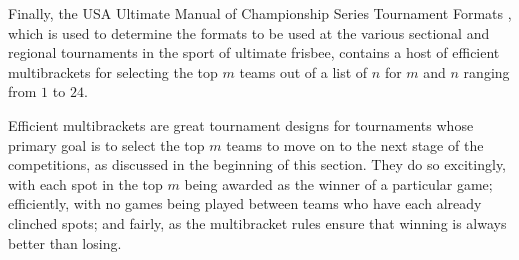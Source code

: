 {    Finally, the USA Ultimate Manual of Championship Series Tournament Formats \cite{ultimate}, which is used to determine the formats to be used at the various sectional and regional tournaments in the sport of ultimate frisbee, contains a host of efficient multibrackets for selecting the top $m$ teams out of a list of $n$ for $m$ and $n$ ranging from $1$ to $24.$

    Efficient multibrackets are great tournament designs for tournaments whose primary goal is to select the top $m$ teams to move on to the next stage of the competitions, as discussed in the beginning of this section. They do so excitingly, with each spot in the top $m$ being awarded as the winner of a particular game; efficiently, with no games being played between teams who have each already clinched spots; and fairly, as the multibracket rules ensure that winning is always better than losing.


}